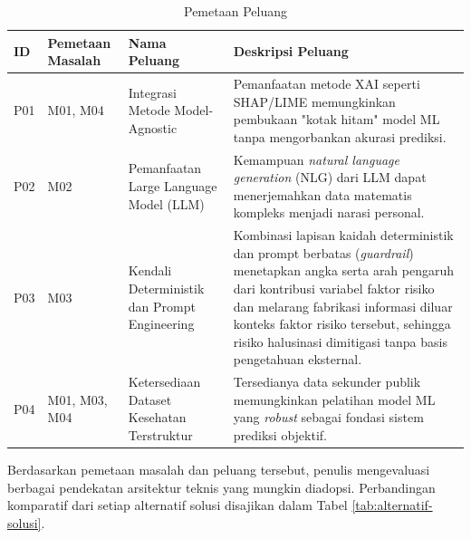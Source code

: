 \begin{table}[H]
    \caption{Pemetaan Peluang}
    \label{tab:pemetaan-peluang}
    \centering
    \small
    \begin{tabular}{|p{1cm}|p{2cm}|p{4.5cm}|p{5cm}|}
        \hline
        \textbf{ID} & \textbf{Pemetaan Masalah} & \textbf{Nama Peluang} & \textbf{Deskripsi Peluang} \\
        \hline
        P01 & M01, M04 & Integrasi Metode Model-Agnostic & Pemanfaatan metode XAI seperti SHAP/LIME memungkinkan pembukaan "kotak hitam" model ML tanpa mengorbankan akurasi prediksi. \\
        \hline
        P02 & M02 & Pemanfaatan Large Language Model (LLM) & Kemampuan \emph{natural language generation} (NLG) dari LLM dapat menerjemahkan data matematis kompleks menjadi narasi personal. \\
        \hline
        P03 & M03 & Kendali Deterministik dan Prompt Engineering & Kombinasi lapisan kaidah deterministik dan prompt berbatas (\emph{guardrail}) menetapkan angka serta arah pengaruh dari kontribusi variabel faktor risiko dan melarang fabrikasi informasi diluar konteks faktor risiko tersebut, sehingga risiko halusinasi dimitigasi tanpa basis pengetahuan eksternal. \\
        \hline
        P04 & M01, M03, M04 & Ketersediaan Dataset Kesehatan Terstruktur & Tersedianya data sekunder publik memungkinkan pelatihan model ML yang \emph{robust} sebagai fondasi sistem prediksi objektif. \\
        \hline
    \end{tabular}
\end{table}

Berdasarkan pemetaan masalah dan peluang tersebut, penulis mengevaluasi berbagai pendekatan arsitektur teknis yang mungkin diadopsi. Perbandingan komparatif dari setiap alternatif solusi disajikan dalam Tabel \ref{tab:alternatif-solusi}.

